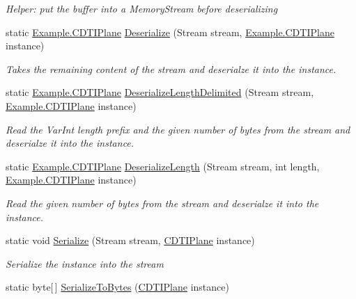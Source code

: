 \begin{DoxyCompactItemize}
\begin{DoxyCompactList}\small\item\em Helper\+: put the buffer into a Memory\+Stream before deserializing\end{DoxyCompactList}\item 
static \hyperlink{class_example_1_1_c_d_t_i_plane}{Example.\+C\+D\+T\+I\+Plane} \hyperlink{class_example_1_1_c_d_t_i_plane_ad4231bb21fad192ec5235136c7efc2f3}{Deserialize} (Stream stream, \hyperlink{class_example_1_1_c_d_t_i_plane}{Example.\+C\+D\+T\+I\+Plane} instance)
\begin{DoxyCompactList}\small\item\em Takes the remaining content of the stream and deserialze it into the instance.\end{DoxyCompactList}\item 
static \hyperlink{class_example_1_1_c_d_t_i_plane}{Example.\+C\+D\+T\+I\+Plane} \hyperlink{class_example_1_1_c_d_t_i_plane_ae2f44dc0c44f735cb4d8cc977d5a8e01}{Deserialize\+Length\+Delimited} (Stream stream, \hyperlink{class_example_1_1_c_d_t_i_plane}{Example.\+C\+D\+T\+I\+Plane} instance)
\begin{DoxyCompactList}\small\item\em Read the Var\+Int length prefix and the given number of bytes from the stream and deserialze it into the instance.\end{DoxyCompactList}\item 
static \hyperlink{class_example_1_1_c_d_t_i_plane}{Example.\+C\+D\+T\+I\+Plane} \hyperlink{class_example_1_1_c_d_t_i_plane_a0a9d43348ee794a421d41c1fe66865db}{Deserialize\+Length} (Stream stream, int length, \hyperlink{class_example_1_1_c_d_t_i_plane}{Example.\+C\+D\+T\+I\+Plane} instance)
\begin{DoxyCompactList}\small\item\em Read the given number of bytes from the stream and deserialze it into the instance.\end{DoxyCompactList}\item 
static void \hyperlink{class_example_1_1_c_d_t_i_plane_a56aa1ceb3a4ad073c405dd9fad2bdc57}{Serialize} (Stream stream, \hyperlink{class_example_1_1_c_d_t_i_plane}{C\+D\+T\+I\+Plane} instance)
\begin{DoxyCompactList}\small\item\em Serialize the instance into the stream\end{DoxyCompactList}\item 
static byte\mbox{[}$\,$\mbox{]} \hyperlink{class_example_1_1_c_d_t_i_plane_a6de7c84b310e228f607f6dc5ed9ed3e3}{Serialize\+To\+Bytes} (\hyperlink{class_example_1_1_c_d_t_i_plane}{C\+D\+T\+I\+Plane} instance)

\end{DoxyCompactItemize}
